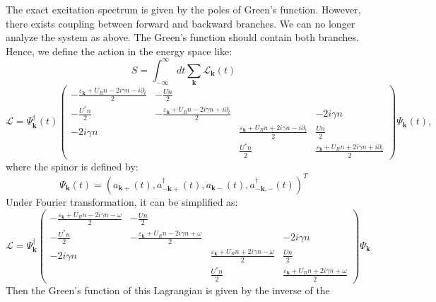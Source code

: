 \documentclass[aps,onecolumn,superscriptaddress,notitlepage,longbibliography]{revtex4-1}
\begin{document}
The exact excitation spectrum is given by the poles of Green's function.
However, there exists coupling between forward and backward branches. We can
no longer analyze the system as above. The Green's function should contain
both branches. Hence, we define the action in the energy space like:
\begin{equation}
  S = \int_{- \infty}^{\infty} d t \sum_{\mathbf{k}}
  \mathcal{L}_{\mathbf{k}} (t)
\end{equation}
\begin{equation}
  \mathcal{L}= \Psi_{\mathbf{k}}^{\dagger} (t) \left(\begin{array}{cccc}
    - \frac{\varepsilon_{\mathbf{k}} + U_R n - 2 i \gamma n - i
    \partial_t}{2} & - \frac{U n}{2} &  & \\
    - \frac{U^{\ast} n}{2} & - \frac{\varepsilon_{\mathbf{k}} + U_R n - 2 i
    \gamma n + i \partial_t}{2} &  & - 2 i \gamma n\\
    - 2 i \gamma n &  & \frac{\varepsilon_{\mathbf{k}} + U_R n + 2 i \gamma
    n - i \partial_t}{2} & \frac{U n}{2}\\
    &  & \frac{U^{\ast} n}{2} & \frac{\varepsilon_{\mathbf{k}} + U_R n + 2
    i \gamma n + i \partial_t}{2}
  \end{array}\right) \Psi_{\mathbf{k}} (t),
\end{equation}
where the spinor is defined by:
\begin{equation}
  \Psi_{\mathbf{k}} (t) = (a_{\mathbf{k}+} (t),
  a^{\dagger}_{-\mathbf{k}+} (t), a_{\mathbf{k}-} (t),
  a^{\dagger}_{-\mathbf{k}, -} (t))^T
\end{equation}
Under Fourier transformation, it can be simplified as:
\begin{equation}
  \mathcal{L}= \Psi_{\mathbf{k}}^{\dagger} \left(\begin{array}{cccc}
    - \frac{\varepsilon_{\mathbf{k}} + U_R n - 2 i \gamma n - \omega}{2} & -
    \frac{U n}{2} &  & \\
    - \frac{U^{\ast} n}{2} & - \frac{\varepsilon_{\mathbf{k}} + U_R n - 2 i
    \gamma n + \omega}{2} &  & - 2 i \gamma n\\
    - 2 i \gamma n &  & \frac{\varepsilon_{\mathbf{k}} + U_R n + 2 i \gamma
    n - \omega}{2} & \frac{U n}{2}\\
    &  & \frac{U^{\ast} n}{2} & \frac{\varepsilon_{\mathbf{k}} + U_R n + 2
    i \gamma n + \omega}{2}
  \end{array}\right) \Psi_{\mathbf{k}}
\end{equation}
Then the Green's function of this Lagrangian is given by the inverse of the
\end{document}

